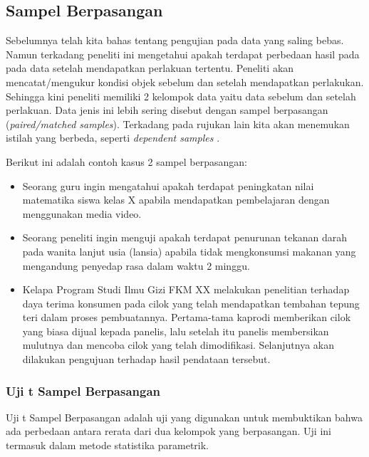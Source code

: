 \documentclass[
]{book}
\providecommand{\tightlist}{%
  \setlength{\itemsep}{0pt}\setlength{\parskip}{0pt}}
\begin{document}
\hypertarget{sampel-berpasangan}{%
\subsection{Sampel Berpasangan}\label{sampel-berpasangan}}

Sebelumnya telah kita bahas tentang pengujian pada data yang saling bebas. Namun terkadang peneliti ini mengetahui apakah terdapat perbedaan hasil pada pada data setelah mendapatkan perlakuan tertentu. Peneliti akan mencatat/mengukur kondisi objek sebelum dan setelah mendapatkan perlakukan. Sehingga kini peneliti memiliki 2 kelompok data yaitu data sebelum dan setelah perlakuan. Data jenis ini lebih sering disebut dengan sampel berpasangan (\emph{paired/matched samples}). Terkadang pada rujukan lain kita akan menemukan istilah yang berbeda, seperti \emph{dependent samples} \citep{allan18}.

Berikut ini adalah contoh kasus 2 sampel berpasangan:

\begin{itemize}
\tightlist
\item
  Seorang guru ingin mengatahui apakah terdapat peningkatan nilai matematika siswa kelas X apabila mendapatkan pembelajaran dengan menggunakan media video.
\item
  Seorang peneliti ingin menguji apakah terdapat penurunan tekanan darah pada wanita lanjut usia (lansia) apabila tidak mengkonsumsi makanan yang mengandung penyedap rasa dalam waktu 2 minggu.
\item
  Kelapa Program Studi Ilmu Gizi FKM XX melakukan penelitian terhadap daya terima konsumen pada cilok yang telah mendapatkan tembahan tepung teri dalam proses pembuatannya. Pertama-tama kaprodi memberikan cilok yang biasa dijual kepada panelis, lalu setelah itu panelis membersikan mulutnya dan mencoba cilok yang telah dimodifikasi. Selanjutnya akan dilakukan pengujuan terhadap hasil pendataan tersebut.
\end{itemize}

\hypertarget{uji-t-sampel-berpasangan}{%
\subsubsection{Uji t Sampel Berpasangan}\label{uji-t-sampel-berpasangan}}

Uji t Sampel Berpasangan adalah uji yang digunakan untuk membuktikan bahwa ada perbedaan antara rerata dari dua kelompok yang berpasangan. Uji ini termasuk dalam metode statistika parametrik.
\end{document}
